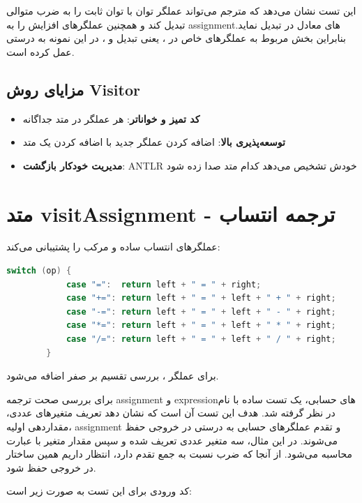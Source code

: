 \documentclass[12pt]{report}
\begin{document}
	این تست نشان می‌دهد که مترجم می‌تواند عملگر توان با توان ثابت را به ضرب متوالی تبدیل کند و همچنین عملگرهای افزایش را به assignmentهای معادل در  تبدیل نماید. 
	بنابراین بخش مربوط به عملگرهای خاص در ، یعنی تبدیل \lr{**} و \lr{++}، در این نمونه به درستی عمل کرده است.
	
	\subsection{مزایای روش Visitor}
	
	\begin{itemize}
		\item \textbf{کد تمیز و خواناتر}: هر عملگر در متد جداگانه
		\item \textbf{توسعه‌پذیری بالا}: اضافه کردن عملگر جدید با اضافه کردن یک متد
		\item \textbf{مدیریت خودکار بازگشت}: ANTLR خودش تشخیص می‌دهد کدام متد صدا زده شود
	\end{itemize}
	
	\section{متد visitAssignment - ترجمه انتساب}
	
	عملگرهای انتساب ساده و مرکب را پشتیبانی می‌کند:
	
	\setLTR
	\begin{lstlisting}[language=Java]
		switch (op) {
			case "=":  return left + " = " + right;
			case "+=": return left + " = " + left + " + " + right;
			case "-=": return left + " = " + left + " - " + right;
			case "*=": return left + " = " + left + " * " + right;
			case "/=": return left + " = " + left + " / " + right;
		}
	\end{lstlisting}
	\setRTL
	
	برای عملگر \lr{/=}، بررسی تقسیم بر صفر اضافه می‌شود.
	
	
	
	
	برای بررسی صحت ترجمه assignment و expressionهای حسابی، یک تست ساده با نام  در نظر گرفته شد.
	هدف این تست آن است که نشان دهد تعریف متغیرهای عددی، مقداردهی اولیه، assignment و تقدم عملگرهای حسابی به درستی در خروجی  حفظ می‌شوند.
	در این مثال، سه متغیر عددی تعریف شده و سپس مقدار متغیر  با عبارت  محاسبه می‌شود.
	از آنجا که ضرب نسبت به جمع تقدم دارد، انتظار داریم همین ساختار در خروجی حفظ شود.
	
	کد ورودی  برای این تست به صورت زیر است:
	
\end{document}
